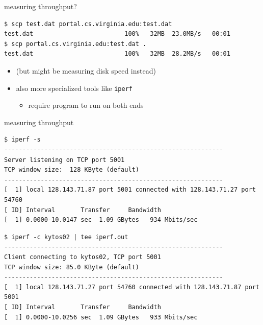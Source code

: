 \begin{frame}[fragile]{measuring throughput?}
\begin{Verbatim}[fontsize=\fontsize{10}{11}]
$ scp test.dat portal.cs.virginia.edu:test.dat
test.dat                         100%   32MB  23.0MB/s   00:01    
$ scp portal.cs.virginia.edu:test.dat .
test.dat                         100%   32MB  28.2MB/s   00:01   
\end{Verbatim}
\begin{itemize}
\item (but might be measuring disk speed instead)
\vspace{.5cm}
\item also more specialized tools like \texttt{iperf}
    \begin{itemize}
    \item require program to run on both ends
    \end{itemize}
\end{itemize}
\end{frame}

\begin{frame}[fragile]{measuring throughput}
\begin{Verbatim}[fontsize=\fontsize{10}{11}]
$ iperf -s
------------------------------------------------------------
Server listening on TCP port 5001
TCP window size:  128 KByte (default)
------------------------------------------------------------
[  1] local 128.143.71.87 port 5001 connected with 128.143.71.27 port 54760
[ ID] Interval       Transfer     Bandwidth
[  1] 0.0000-10.0147 sec  1.09 GBytes   934 Mbits/sec
\end{Verbatim}
\begin{Verbatim}[fontsize=\fontsize{10}{11}]
$ iperf -c kytos02 | tee iperf.out
------------------------------------------------------------
Client connecting to kytos02, TCP port 5001
TCP window size: 85.0 KByte (default)
------------------------------------------------------------
[  1] local 128.143.71.27 port 54760 connected with 128.143.71.87 port 5001
[ ID] Interval       Transfer     Bandwidth
[  1] 0.0000-10.0256 sec  1.09 GBytes   933 Mbits/sec
\end{Verbatim}
\end{frame}

